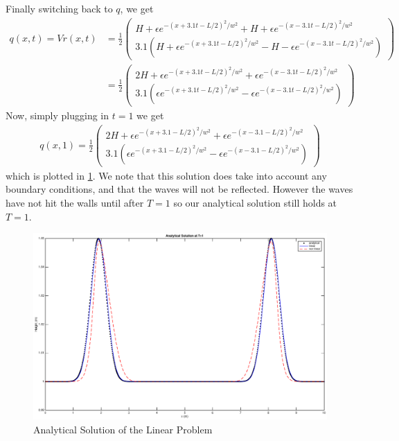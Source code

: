 Finally switching back to $q$, we get 
\begin{align*}
q(x,t) = Vr(x,t) &= \frac{1}{2} \begin{pmatrix}
H + \epsilon e^{-(x+3.1t-L/2)^2/w^2} +H + \epsilon e^{-(x-3.1t-L/2)^2/w^2} \\
3.1(H + \epsilon e^{-(x+3.1t-L/2)^2/w^2} -H - \epsilon e^{-(x-3.1t-L/2)^2/w^2})
\end{pmatrix} \\
&= \frac{1}{2}\begin{pmatrix}
 2H + \epsilon e^{-(x+3.1t-L/2)^2/w^2} + \epsilon e^{-(x-3.1t-L/2)^2/w^2} \\
3.1( \epsilon e^{-(x+3.1t-L/2)^2/w^2} - \epsilon e^{-(x-3.1t-L/2)^2/w^2})
\end{pmatrix}
\end{align*} 
Now, simply plugging in $t=1$ we get
\begin{align*}
q(x,1) = \frac{1}{2}\begin{pmatrix}
 2H + \epsilon e^{-(x+3.1-L/2)^2/w^2} + \epsilon e^{-(x-3.1-L/2)^2/w^2} \\
3.1( \epsilon e^{-(x+3.1-L/2)^2/w^2} - \epsilon e^{-(x-3.1-L/2)^2/w^2})
\end{pmatrix}
\end{align*}
which is plotted in \ref{anal}.
We note that this solution does take into account any boundary conditions, and that the waves will not be reflected. However the waves have not hit the walls until after $T=1$ so our analytical solution still holds at $T=1$. 

\begin{figure}
\begin{center}
\includegraphics[scale=0.35]{analytical.eps}
\caption{Analytical Solution of the Linear Problem}
\label{anal}
\end{center}
\end{figure}

